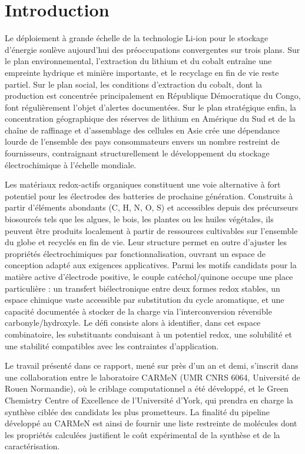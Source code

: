 \section{Introduction}

Le déploiement à grande échelle de la technologie Li-ion pour le stockage d'énergie soulève aujourd'hui des préoccupations convergentes sur trois plans. Sur le plan environnemental, l'extraction du lithium et du cobalt entraîne une empreinte hydrique et minière importante, et le recyclage en fin de vie reste partiel. Sur le plan social, les conditions d'extraction du cobalt, dont la production est concentrée principalement en République Démocratique du Congo, font régulièrement l'objet d'alertes documentées. Sur le plan stratégique enfin, la concentration géographique des réserves de lithium en Amérique du Sud et de la chaîne de raffinage et d'assemblage des cellules en Asie crée une dépendance lourde de l'ensemble des pays consommateurs envers un nombre restreint de fournisseurs, contraignant structurellement le développement du stockage électrochimique à l'échelle mondiale.

Les matériaux redox-actifs organiques constituent une voie alternative à fort potentiel pour les électrodes des batteries de prochaine génération. Construits à partir d'éléments abondants (C, H, N, O, S) et accessibles depuis des précurseurs biosourcés tels que les algues, le bois, les plantes ou les huiles végétales, ils peuvent être produits localement à partir de ressources cultivables sur l'ensemble du globe et recyclés en fin de vie. Leur structure permet en outre d'ajuster les propriétés électrochimiques par fonctionnalisation, ouvrant un espace de conception adapté aux exigences applicatives. Parmi les motifs candidats pour la matière active d'électrode positive, le couple catéchol/quinone occupe une place particulière : un transfert biélectronique entre deux formes redox stables, un espace chimique vaste accessible par substitution du cycle aromatique, et une capacité documentée à stocker de la charge via l'interconversion réversible carbonyle/hydroxyle. Le défi consiste alors à identifier, dans cet espace combinatoire, les substituants conduisant à un potentiel redox, une solubilité et une stabilité compatibles avec les contraintes d'application.

Le travail présenté dans ce rapport, mené sur près d'un an et demi, s'inscrit dans une collaboration entre le laboratoire CARMeN (UMR CNRS 6064, Université de Rouen Normandie), où le criblage computationnel a été développé, et le Green Chemistry Centre of Excellence de l'Université d'York, qui prendra en charge la synthèse ciblée des candidats les plus prometteurs. La finalité du pipeline développé au CARMeN est ainsi de fournir une liste restreinte de molécules dont les propriétés calculées justifient le coût expérimental de la synthèse et de la caractérisation.

